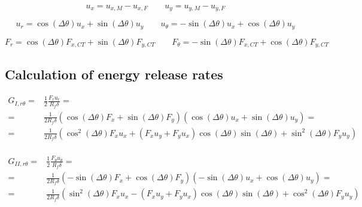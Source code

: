 \documentclass[a4paper]{jpconf}
\begin{document}
\begin{equation}
u_{x}=u_{x,M}-u_{x,F}\qquad u_{y}=u_{y,M}-u_{y,F}
\end{equation}

\begin{equation}
u_{r}=\cos\left(\Delta\theta\right) u_{x}+\sin\left(\Delta\theta\right) u_{y}\qquad u_{\theta}=-\sin\left(\Delta\theta\right) u_{x}+\cos\left(\Delta\theta\right) u_{y}
\end{equation}

\begin{equation}
F_{r}=\cos\left(\Delta\theta\right) F_{x,CT}+\sin\left(\Delta\theta\right) F_{y,CT}\qquad F_{\theta}=-\sin\left(\Delta\theta\right) F_{x,CT}+\cos\left(\Delta\theta\right) F_{y,CT}
\end{equation}

\subsection{Calculation of energy release rates}

\begin{equation}
\begin{split}
G_{I,r\theta} = &\frac{1}{2}\frac{F_{r}u_{r}}{R_{f}\delta}=\\
= &\frac{1}{2R_{f}\delta}\left(\cos\left(\Delta\theta\right) F_{x}+\sin\left(\Delta\theta\right)F_{y}\right)\left(\cos\left(\Delta\theta\right) u_{x}+\sin\left(\Delta\theta\right) u_{y}\right)=\\
= &\frac{1}{2R_{f}\delta}\left(\cos^{2}\left(\Delta\theta\right) F_{x}u_{x}+\left(F_{x}u_{y}+F_{y}u_{x}\right)\cos\left(\Delta\theta\right)\sin\left(\Delta\theta\right)+\sin^{2}\left(\Delta\theta\right)F_{y}u_{y}\right)\\
\end{split}
\end{equation}

\begin{equation}
\begin{split}
G_{II,r\theta} = &\frac{1}{2}\frac{F_{\theta}u_{\theta}}{R_{f}\delta}=\\
= &\frac{1}{2R_{f}\delta}\left(-\sin\left(\Delta\theta\right) F_{x}+\cos\left(\Delta\theta\right)F_{y}\right)\left(-\sin\left(\Delta\theta\right) u_{x}+\cos\left(\Delta\theta\right) u_{y}\right)=\\
= &\frac{1}{2R_{f}\delta}\left(\sin^{2}\left(\Delta\theta\right) F_{x}u_{x}-\left(F_{x}u_{y}+F_{y}u_{x}\right)\cos\left(\Delta\theta\right)\sin\left(\Delta\theta\right)+\cos^{2}\left(\Delta\theta\right)F_{y}u_{y}\right)\\
\end{split}
\end{equation}
\end{document}
